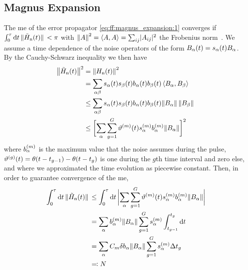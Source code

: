 \subsection{Magnus Expansion}\label{subsec:app:ff:convergence:magnus_expansion}
The \gls{me} of the error propagator \cref{eq:ff:magnus_expansion:1} converges if $\int_0^\tau\dd{t}\norm*{\tilde{H}_{\mathrm{n}}(t)} < \pi$ with $\norm{A}^2 = \expval{A,A} = \sum_{ij}\lvert A_{ij}\rvert^2$ the Frobenius norm~\cite{Moan1999}.
We assume a time dependence of the noise operators of the form $B_\alpha(t) = s_\alpha(t)B_\alpha$.
By the Cauchy-Schwarz inequality we then have
\begin{equation}
    \begin{split}
        \bigl\lVert\tilde{H}_{\mathrm{n}}(t)\bigr\rVert^2 &= \norm{H_{\mathrm{n}}(t)}^2 \\
                          &= \sum_{\alpha\beta} s_\alpha(t) s_{\beta}(t) b_\alpha(t) b_{\beta}(t)\expval{B_\alpha,B_{\beta}} \\
                          &\leq\sum_{\alpha\beta} s_\alpha(t) s_{\beta}(t) b_\alpha(t) b_{\beta}(t)
                             \norm*{B_\alpha}\norm*{B_{\beta}} \\
                          &\leq\biggl[\sum_{\alpha}\sum_{g=1}^{G}\vartheta^{(m)}(t)
                             s_\alpha^{(m)} b_\alpha^{(m)}\norm{B_\alpha}\biggr]^2
    \end{split}
\end{equation}
where $b_{\alpha}^{(m)}$ is the maximum value that the noise assumes during the pulse, $\vartheta^{(g)}(t) = \theta(t - t_{g-1}) - \theta(t - t_g)$ is one during the $g$th time interval and zero else, and where we approximated the time evolution as piecewise constant.
Then, in order to guarantee convergence of the \gls{me},
\begin{equation}
    \begin{split}
        \int_0^{\tau}\dd{t}\norm*{\Hnt(t)} &\leq\int_0^\tau\dd{t}\abs\bigg{\sum_{\alpha}\sum_{g=1}^{G}
                                              \vartheta\gth{m}(t) s_\alpha\gth{m} b_\alpha\gth{m}\norm{B_\alpha}} \\
                                           &= \sum_{\alpha} b_\alpha\gth{m}\norm{B_\alpha}\sum_{g=1}^{G}s_\alpha\gth{m}
                                              \int_{t_{g-1}}^{t_{g}}\dd{t} \\
                                           &= \sum_{\alpha} C_m\delta b_\alpha\norm{B_\alpha}\sum_{g=1}^{G}
                                              s_\alpha\gth{m}\Delta t_g \\
                                           &\eqqcolon N
    \end{split}
\end{equation}
